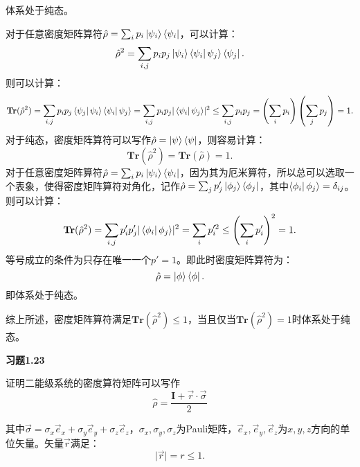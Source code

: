 \documentclass[reqno,a4paper,12pt]{amsart}
\begin{document}
体系处于纯态。
\begin{tcolorbox}[breakable, colback = black!5!white, colframe = black]
对于任意密度矩阵算符$\hat{\rho} = \sum_i p_i \ket{\psi_i} \bra{\psi_i}$，可以计算：
\[
	\hat{\rho}^2 = \sum_{i,j} p_i p_j \ket{\psi_i} \bra{\psi_i} \psi_j \rangle \bra{\psi_j}.
\]
则可以计算：
\[
	\mathbf{Tr}(\hat{\rho}^2) = \sum_{i,j} p_i p_j \bra{\psi_j} \psi_i \rangle \bra{\psi_i} \psi_j \rangle = \sum_{i,j} p_i p_j \vert \bra{\psi_i} \psi_j \rangle \vert^2 \leq \sum_{i,j} p_i p_j = \left(\sum_i p_i\right) \left( \sum_j p_j \right) = 1.
\]
对于纯态，密度矩阵算符可以写作$\hat{\rho} = \ket{\psi}\bra{\psi}$，则容易计算：
\[
	\mathbf{Tr}(\hat{\rho}^2) = \mathbf{Tr}(\hat{\rho}) = 1.
\]
对于任意密度矩阵算符$\hat{\rho} = \sum_i p_i \ket{\psi_i}\bra{\psi_i}$，因为其为厄米算符，所以总可以选取一个表象，使得密度矩阵算符对角化，记作$\hat{\rho} = \sum_j p_j' \ket{\phi_j}\bra{\phi_j}$，其中$\bra{\phi_i} \phi_j \rangle = \delta_{ij}$。则可以计算：
\[
	\mathbf{Tr}(\hat{\rho}^2) = \sum_{i,j}p_i'p_j' \vert \bra{\phi_i} \phi_j \rangle \vert^2 = \sum_{i}p_i'^2 \leq \left( \sum_i p_i' \right)^2 = 1.
\]
等号成立的条件为只存在唯一一个$p' = 1$。即此时密度矩阵算符为：
\[
	\hat{\rho} = \ket{\phi} \bra{\phi}.
\]
即体系处于纯态。

综上所述，密度矩阵算符满足$\mathbf{Tr}(\hat{\rho}^2) \leq 1$，当且仅当$\mathbf{Tr}(\hat{\rho}^2) = 1$时体系处于纯态。
\end{tcolorbox}

\textbf{习题1.23}

证明二能级系统的密度算符矩阵可以写作
\[
	\hat{\rho} = \frac{\mathbf{I} + \vec{r} \cdot \vec{\sigma}}{2}
\]

其中$\vec{\sigma} = \sigma_x \vec{e}_x + \sigma_y \vec{e}_y + \sigma_z \vec{e}_z$，$\sigma_x,\sigma_y,\sigma_z$为Pauli矩阵，$\vec{e}_x,\vec{e}_y,\vec{e}_z$为$x, y, z$方向的单位矢量。矢量$\vec{r}$满足：
\[
	\vert \vec{r} \vert = r \leq 1.
\]
\end{document}
